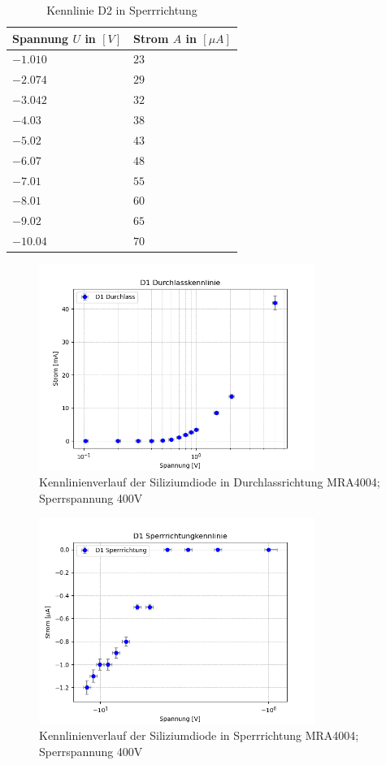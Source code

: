 \documentclass{article}
\theoremstyle{definition}
\begin{document}
    
    \begin{table}[h!]
    \centering
    \begin{tabular}{|l|l|}
    \hline
    \textbf{Spannung $U$ in $[V]$} & \textbf{Strom $A$ in $[\mu A]$} \\
    \hline
    $-1.010$ & $23$ \\
    $-2.074$ & $29$\\
    $-3.042$ & $32$\\
    $-4.03$ & $38$\\
    $-5.02$ & $43$\\
    $-6.07$ & $48$\\
    $-7.01$ & $55$\\
    $-8.01$ & $60$\\
    $-9.02$ & $65$\\
    $-10.04$ & $70$\\ 
    \hline
    \end{tabular}
    \caption{Kennlinie D2 in Sperrrichtung}
    \label{tab:D2sperr}
    \end{table}


\begin{figure}[H]
    \centering
    \includegraphics[width=0.8\textwidth]{figs/dioden_d1.png}
    \caption{Kennlinienverlauf der Siliziumdiode in Durchlassrichtung MRA4004; Sperrspannung 400V\cite{anleitung} }
    \label{dioden_d1}
\end{figure}

\begin{figure}[H]
    \centering
    \includegraphics[width=0.8\textwidth]{figs/dioden_d1_sperr.png}
    \caption{Kennlinienverlauf der Siliziumdiode in Sperrrichtung MRA4004; Sperrspannung 400V\cite{anleitung}}
    \label{dioden_d1_sperr}
\end{figure}
\end{document}
